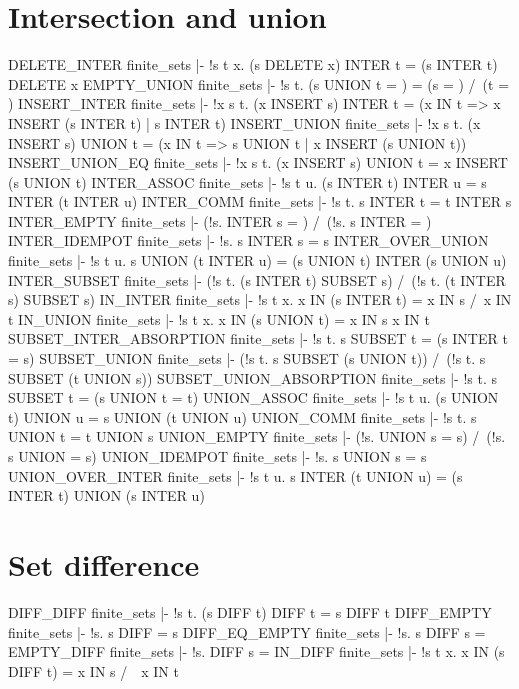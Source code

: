 \section{Intersection and union}
\THEOREM DELETE\_INTER finite\_sets
|- !s t x. (s DELETE x) INTER t = (s INTER t) DELETE x
\ENDTHEOREM
\THEOREM EMPTY\_UNION finite\_sets
|- !s t. (s UNION t = {}) = (s = {}) /\ (t = {})
\ENDTHEOREM
\THEOREM INSERT\_INTER finite\_sets
|- !x s t.
    (x INSERT s) INTER t = (x IN t => x INSERT (s INTER t) | s INTER t)
\ENDTHEOREM
\THEOREM INSERT\_UNION finite\_sets
|- !x s t.
    (x INSERT s) UNION t = (x IN t => s UNION t | x INSERT (s UNION t))
\ENDTHEOREM
\THEOREM INSERT\_UNION\_EQ finite\_sets
|- !x s t. (x INSERT s) UNION t = x INSERT (s UNION t)
\ENDTHEOREM
\THEOREM INTER\_ASSOC finite\_sets
|- !s t u. (s INTER t) INTER u = s INTER (t INTER u)
\ENDTHEOREM
\THEOREM INTER\_COMM finite\_sets
|- !s t. s INTER t = t INTER s
\ENDTHEOREM
\THEOREM INTER\_EMPTY finite\_sets
|- (!s. {} INTER s = {}) /\ (!s. s INTER {} = {})
\ENDTHEOREM
\THEOREM INTER\_IDEMPOT finite\_sets
|- !s. s INTER s = s
\ENDTHEOREM
\THEOREM INTER\_OVER\_UNION finite\_sets
|- !s t u. s UNION (t INTER u) = (s UNION t) INTER (s UNION u)
\ENDTHEOREM
\THEOREM INTER\_SUBSET finite\_sets
|- (!s t. (s INTER t) SUBSET s) /\ (!s t. (t INTER s) SUBSET s)
\ENDTHEOREM
\THEOREM IN\_INTER finite\_sets
|- !s t x. x IN (s INTER t) = x IN s /\ x IN t
\ENDTHEOREM
\THEOREM IN\_UNION finite\_sets
|- !s t x. x IN (s UNION t) = x IN s \/ x IN t
\ENDTHEOREM
\THEOREM SUBSET\_INTER\_ABSORPTION finite\_sets
|- !s t. s SUBSET t = (s INTER t = s)
\ENDTHEOREM
\THEOREM SUBSET\_UNION finite\_sets
|- (!s t. s SUBSET (s UNION t)) /\ (!s t. s SUBSET (t UNION s))
\ENDTHEOREM
\THEOREM SUBSET\_UNION\_ABSORPTION finite\_sets
|- !s t. s SUBSET t = (s UNION t = t)
\ENDTHEOREM
\THEOREM UNION\_ASSOC finite\_sets
|- !s t u. (s UNION t) UNION u = s UNION (t UNION u)
\ENDTHEOREM
\THEOREM UNION\_COMM finite\_sets
|- !s t. s UNION t = t UNION s
\ENDTHEOREM
\THEOREM UNION\_EMPTY finite\_sets
|- (!s. {} UNION s = s) /\ (!s. s UNION {} = s)
\ENDTHEOREM
\THEOREM UNION\_IDEMPOT finite\_sets
|- !s. s UNION s = s
\ENDTHEOREM
\THEOREM UNION\_OVER\_INTER finite\_sets
|- !s t u. s INTER (t UNION u) = (s INTER t) UNION (s INTER u)
\ENDTHEOREM
\section{Set difference}
\THEOREM DIFF\_DIFF finite\_sets
|- !s t. (s DIFF t) DIFF t = s DIFF t
\ENDTHEOREM
\THEOREM DIFF\_EMPTY finite\_sets
|- !s. s DIFF {} = s
\ENDTHEOREM
\THEOREM DIFF\_EQ\_EMPTY finite\_sets
|- !s. s DIFF s = {}
\ENDTHEOREM
\THEOREM EMPTY\_DIFF finite\_sets
|- !s. {} DIFF s = {}
\ENDTHEOREM
\THEOREM IN\_DIFF finite\_sets
|- !s t x. x IN (s DIFF t) = x IN s /\ ~x IN t
\ENDTHEOREM
